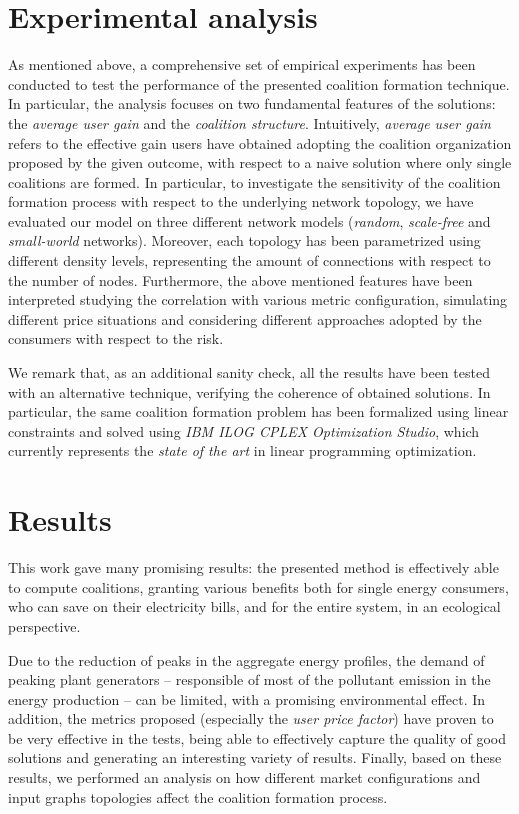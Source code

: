 \documentclass[11pt, twoside, titlepage, a4paper, openright]{report}
\begin{document}
\section{Experimental analysis}\label{sec:introexp}

As mentioned above, a comprehensive set of empirical experiments has been conducted to test the performance of the presented coalition formation technique. In particular, the analysis focuses on two fundamental features of the solutions: the \textit{average user gain} and the \textit{coalition structure}. Intuitively, \textit{average user gain} refers to the effective gain users have obtained adopting the coalition organization proposed by the given outcome, with respect to a naive solution where only single coalitions are formed.
In particular, to investigate the sensitivity of the coalition
formation process with respect to the underlying network topology, we
have evaluated our model on three different network models (\textit{random}, \textit{scale-free} and \textit{small-world} networks). Moreover, each topology has been parametrized using different density levels, representing the amount of connections with respect to the number of nodes.
Furthermore, the above mentioned features have been interpreted studying the correlation with various metric configuration, simulating different price situations and considering different approaches adopted by the consumers with respect to the risk.

We remark that, as an additional sanity check, all the results have been tested with an alternative technique, verifying the coherence of obtained solutions. In particular, the same coalition formation problem has been formalized using linear constraints and solved using \textit{IBM ILOG CPLEX Optimization Studio}, which currently represents the \textit{state of the art} in linear programming optimization.

\section{Results}

This work gave many promising results: the presented method is effectively able to compute coalitions, granting various benefits both for single energy consumers, who can save on their electricity bills, and for the entire system, in an ecological perspective.

\noindent Due to the reduction of peaks in the aggregate energy profiles, the demand of peaking plant generators -- responsible of most of the pollutant emission in the energy production -- can be limited, with a promising environmental effect.
In addition, the metrics proposed (especially the \textit{user price factor}) have proven to be very effective in the tests, being able to effectively capture the quality of good solutions and generating an interesting variety of results. Finally, based on these results, we performed an analysis on how different market configurations and input graphs topologies affect the coalition formation process.
\end{document}
